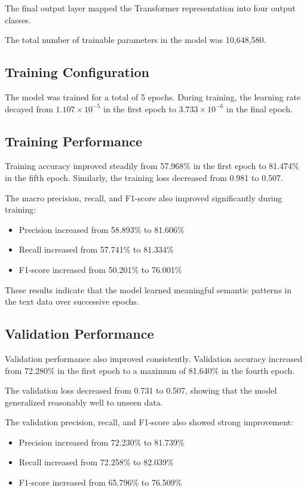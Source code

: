 \documentclass[11pt,a4paper]{article}
\begin{document}
The final output layer mapped the Transformer representation into four output classes.

The total number of trainable parameters in the model was 10,648,580.

\subsection{Training Configuration}

The model was trained for a total of 5 epochs. During training, the learning rate decayed from $1.107 \times 10^{-5}$ in the first epoch to $3.733 \times 10^{-6}$ in the final epoch.

\subsection{Training Performance}

Training accuracy improved steadily from 57.968\% in the first epoch to 81.474\% in the fifth epoch. Similarly, the training loss decreased from 0.981 to 0.507.

The macro precision, recall, and F1-score also improved significantly during training:

\begin{itemize}
    \item Precision increased from 58.893\% to 81.606\%
    \item Recall increased from 57.741\% to 81.334\%
    \item F1-score increased from 50.201\% to 76.001\%
\end{itemize}

These results indicate that the model learned meaningful semantic patterns in the text data over successive epochs.

\subsection{Validation Performance}

Validation performance also improved consistently. Validation accuracy increased from 72.280\% in the first epoch to a maximum of 81.640\% in the fourth epoch.

The validation loss decreased from 0.731 to 0.507, showing that the model generalized reasonably well to unseen data.

The validation precision, recall, and F1-score also showed strong improvement:

\begin{itemize}
    \item Precision increased from 72.230\% to 81.739\%
    \item Recall increased from 72.258\% to 82.039\%
    \item F1-score increased from 65.796\% to 76.509\%
\end{itemize}
\end{document}
